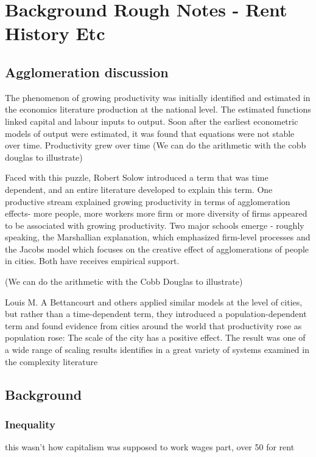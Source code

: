 \chapter{Background Rough Notes - Rent History Etc}

\section{Agglomeration discussion}

The phenomenon of growing productivity was initially identified and estimated in the economics literature production at the national level. The estimated functions linked capital and labour inputs to output.  Soon after the  earliest econometric models of output  were estimated, it was found that equations were not stable over time. Productivity grew over time
(We can do the arithmetic with the cobb douglas to illustrate) 

Faced with this puzzle, Robert Solow introduced a term that was time dependent, and an entire literature developed to explain this term. One productive stream explained growing productivity in terms of agglomeration effects- more people, more workers more firm or more diversity of firms appeared to be associated with growing productivity. Two major schools emerge - roughly speaking,  the Marshallian explanation, which emphasized firm-level processes and the Jacobs model which focuses on the creative effect of agglomerations of people in cities. Both have receives empirical support.

(We can do the arithmetic with the Cobb Douglas to illustrate)

Louis M. A Bettancourt and others applied similar models at the level of cities, but rather than a time-dependent term, they introduced a population-dependent term and found evidence from cities around the world that productivity rose as population rose: The scale of the city has a positive effect. The result  was one of a wide range of scaling results identifies in a great variety of systems examined in the complexity literature 


\section{Background}

\subsection{Inequality}
this wasn't how capitalism was supposed to work
wages part, 
over 50 for rent


